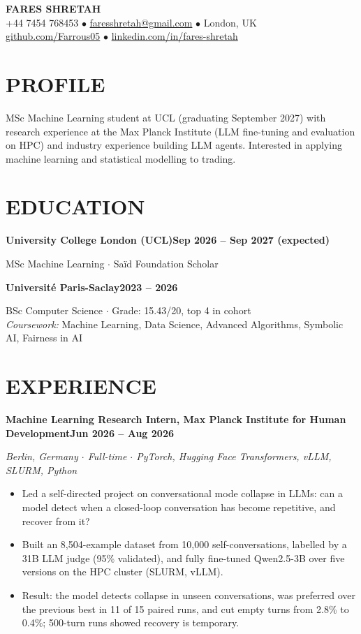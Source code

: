 \documentclass[10pt, a4paper]{article}
\newcommand{\entry}[2]{\vspace{5pt}\textbf{#1}\hfill\textbf{#2}\par}
\newcommand{\sub}[1]{\textit{#1}\par}
\begin{document}
\begin{center}
    {\huge \textbf{FARES SHRETAH}} \\[3pt]
    \small +44 7454 768453 $\bullet$ \href{mailto:faresshretah@gmail.com}{faresshretah@gmail.com} $\bullet$ London, UK \\
    \small \href{https://github.com/Farrous05}{github.com/Farrous05} $\bullet$ \href{https://www.linkedin.com/in/fares-shretah/}{linkedin.com/in/fares-shretah}
\end{center}

\section*{PROFILE}
MSc Machine Learning student at UCL (graduating September 2027) with research experience at the Max Planck Institute (LLM fine-tuning and evaluation on HPC) and industry experience building LLM agents. Interested in applying machine learning and statistical modelling to trading.

\section*{EDUCATION}
\entry{University College London (UCL)}{Sep 2026 -- Sep 2027 (expected)}
MSc Machine Learning $\cdot$ Sa\"id Foundation Scholar

\entry{Universit\'e Paris-Saclay}{2023 -- 2026}
BSc Computer Science $\cdot$ Grade: 15.43/20, top 4 in cohort \\
\textit{Coursework:} Machine Learning, Data Science, Advanced Algorithms, Symbolic AI, Fairness in AI

\section*{EXPERIENCE}
\entry{Machine Learning Research Intern, Max Planck Institute for Human Development}{Jun 2026 -- Aug 2026}
\sub{Berlin, Germany $\cdot$ Full-time $\cdot$ PyTorch, Hugging Face Transformers, vLLM, SLURM, Python}
\begin{itemize}
    \item Led a self-directed project on conversational mode collapse in LLMs: can a model detect when a closed-loop conversation has become repetitive, and recover from it?
    \item Built an 8,504-example dataset from 10,000 self-conversations, labelled by a 31B LLM judge (95\% validated), and fully fine-tuned Qwen2.5-3B over five versions on the HPC cluster (SLURM, vLLM).
    \item Result: the model detects collapse in unseen conversations, was preferred over the previous best in 11 of 15 paired runs, and cut empty turns from 2.8\% to 0.4\%; 500-turn runs showed recovery is temporary.
\end{itemize}
\end{document}
